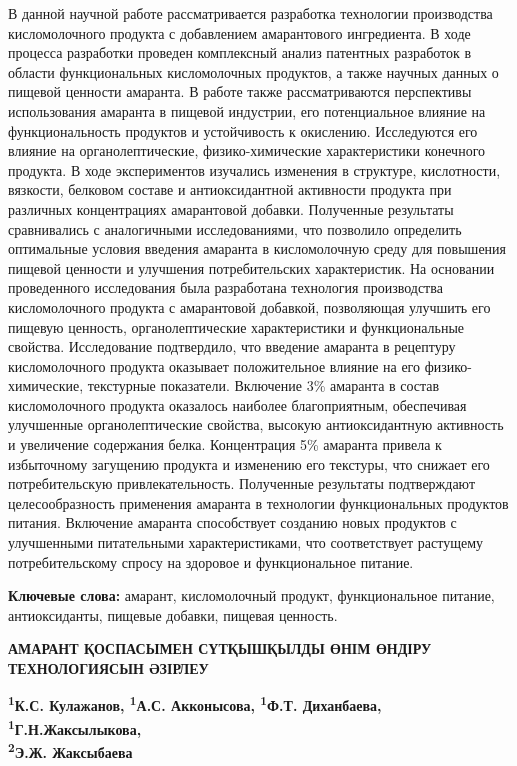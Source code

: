 {В данной научной работе рассматривается разработка технологии
производства кисломолочного продукта с добавлением амарантового
ингредиента. В ходе процесса разработки проведен комплексный анализ
патентных разработок в области функциональных кисломолочных продуктов, а
также научных данных о пищевой ценности амаранта. В работе также
рассматриваются перспективы использования амаранта в пищевой индустрии,
его потенциальное влияние на функциональность продуктов и устойчивость к
окислению. Исследуются его влияние на органолептические,
физико-химические характеристики конечного продукта. В ходе
экспериментов изучались изменения в структуре, кислотности, вязкости,
белковом составе и антиоксидантной активности продукта при различных
концентрациях амарантовой добавки. Полученные результаты сравнивались с
аналогичными исследованиями, что позволило определить оптимальные
условия введения амаранта в кисломолочную среду для повышения пищевой
ценности и улучшения потребительских характеристик. На основании
проведенного исследования была разработана технология производства
кисломолочного продукта с амарантовой добавкой, позволяющая улучшить его
пищевую ценность, органолептические характеристики и функциональные
свойства. Исследование подтвердило, что введение амаранта в рецептуру
кисломолочного продукта оказывает положительное влияние на его
физико-химические, текстурные показатели. Включение 3\% амаранта в
состав кисломолочного продукта оказалось наиболее благоприятным,
обеспечивая улучшенные органолептические свойства, высокую
антиоксидантную активность и увеличение содержания белка. Концентрация
5\% амаранта привела к избыточному загущению продукта и изменению его
текстуры, что снижает его потребительскую привлекательность. Полученные
результаты подтверждают целесообразность применения амаранта в
технологии функциональных продуктов питания. Включение амаранта
способствует созданию новых продуктов с улучшенными питательными
характеристиками, что соответствует растущему потребительскому спросу на
здоровое и функциональное питание.

{\bfseries Ключевые слова:} амарант, кисломолочный продукт, функциональное
питание, антиоксиданты, пищевые добавки, пищевая ценность.

{\bfseries АМАРАНТ ҚОСПАСЫМЕН СҮТҚЫШҚЫЛДЫ ӨНІМ ӨНДІРУ ТЕХНОЛОГИЯСЫН
ӘЗІРЛЕУ}

{\bfseries \textsuperscript{1}К.С. Кулажанов, \textsuperscript{1}А.С.
Акконысова\textsuperscript{\envelope }, \textsuperscript{1}Ф.Т. Диханбаева,
\textsuperscript{1}Г.Н.Жаксылыкова,\\
\textsuperscript{2}Э.Ж. Жаксыбаева}

}

